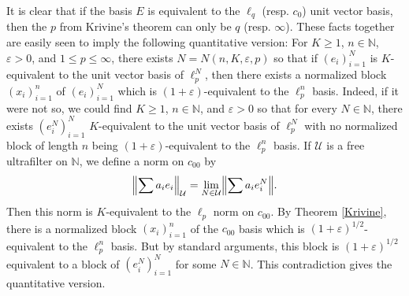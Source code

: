 \documentclass[12pt]{amsart}
\theoremstyle{definition}
\newcommand{\nn}{\mathbb{N}}
\newcommand{\uuu}{\mathcal{U}}
\begin{document}
It is clear that if the basis $E$ is equivalent to the $\ell_q$ (resp. $c_0$) unit vector basis, then the $p$ from Krivine's theorem can only be $q$ (resp. $\infty$).  These facts together are easily seen to imply the following quantitative version: For $K\geqslant 1$, $n\in \nn$, $\varepsilon>0$, and $1\leqslant p\leqslant \infty$, there exists $N=N(n, K, \varepsilon,p)$ so that if $(e_i)_{i=1}^N$ is $K$-equivalent to the unit vector basis of $\ell_p^N$, then there exists a normalized block $(x_i)_{i=1}^n$ of $(e_i)_{i=1}^N$ which is $(1+\varepsilon)$-equivalent to the $\ell_p^n$ basis.  Indeed, if it were not so, we could find $K\geqslant 1$, $n\in \nn$, and $\varepsilon>0$ so that for every $N\in \nn$, there exists $(e_i^N)_{i=1}^N$ $K$-equivalent to the unit vector basis of $\ell_p^N$ with no normalized block of length $n$ being $(1+\varepsilon)$-equivalent to the $\ell_p^n$ basis.  If $\uuu$ is a free ultrafilter on $\nn$, we define a norm on $c_{00}$ by $$\Bigl\|\sum a_i e_i\Bigr\|_\uuu = \underset{N\in \uuu}{\lim} \Bigl\|\sum a_i e_i^N\Bigr\|.$$  Then this norm is $K$-equivalent to the $\ell_p$ norm on $c_{00}$.  By Theorem \ref{Krivine}, there is a normalized block $(x_i)_{i=1}^n$ of the $c_{00}$ basis which is $(1+\varepsilon)^{1/2}$-equivalent to the $\ell_p^n$ basis.  But by standard arguments, this block is $(1+\varepsilon)^{1/2}$ equivalent to a block of $(e_i^N)_{i=1}^N$ for some $N\in \nn$.  This contradiction gives the quantitative version.  
\end{document}
